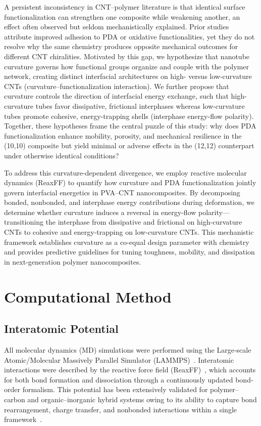 \documentclass[journal=jacsat,manuscript=article]{achemso}
\begin{document}
A persistent inconsistency in CNT–polymer literature is that identical surface 
functionalization can strengthen one composite while weakening another, an effect 
often observed but seldom mechanistically explained. Prior studies attribute 
improved adhesion to PDA or oxidative functionalities, yet they do not resolve why 
the same chemistry produces opposite mechanical outcomes for different CNT 
chiralities. Motivated by this gap, we hypothesize that nanotube curvature governs 
how functional groups organize and couple with the polymer network, creating 
distinct interfacial architectures on high- versus low-curvature CNTs 
(curvature–functionalization interaction). We further propose that curvature 
controls the direction of interfacial energy exchange, such that high-curvature 
tubes favor dissipative, frictional interphases whereas low-curvature tubes promote 
cohesive, energy-trapping shells (interphase energy-flow polarity). Together, these 
hypotheses frame the central puzzle of this study: why does PDA functionalization 
enhance mobility, porosity, and mechanical resilience in the (10,10) composite but 
yield minimal or adverse effects in the (12,12) counterpart under otherwise 
identical conditions?

To address this curvature-dependent divergence, we employ reactive molecular 
dynamics (ReaxFF) to quantify how curvature and PDA functionalization jointly 
govern interfacial energetics in PVA–CNT nanocomposites. By decomposing bonded, 
nonbonded, and interphase energy contributions during deformation, we determine 
whether curvature induces a reversal in energy-flow polarity—transitioning the 
interphase from dissipative and frictional on high-curvature CNTs to cohesive and 
energy-trapping on low-curvature CNTs. This mechanistic framework establishes 
curvature as a co-equal design parameter with chemistry and provides predictive 
guidelines for tuning toughness, mobility, and dissipation in next-generation 
polymer nanocomposites.



\section{Computational Method}

\subsection{Interatomic Potential}

All molecular dynamics (MD) simulations were performed using the Large‐scale Atomic/Molecular Massively Parallel Simulator (LAMMPS)~\cite{THOMPSON2022108171}. Interatomic interactions were described by the reactive force field (ReaxFF)~\cite{van2001reaxff,chenoweth2008reaxff}, which accounts for both bond formation and dissociation through a continuously updated bond‐order formalism. This potential has been extensively validated for polymer–carbon and organic–inorganic hybrid systems owing to its ability to capture bond rearrangement, charge transfer, and nonbonded interactions within a single framework~\cite{van2001reaxff,sharma2012effect}. 
\end{document}
